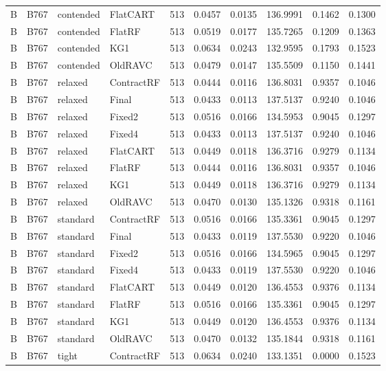 \begin{longtable}{@{}llllllllll@{}}
B & B767 & contended & FlatCART & 513 & 0.0457 & 0.0135 & 136.9991 & 0.1462 & 0.1300\\
B & B767 & contended & FlatRF & 513 & 0.0519 & 0.0177 & 135.7265 & 0.1209 & 0.1363\\
B & B767 & contended & KG1 & 513 & 0.0634 & 0.0243 & 132.9595 & 0.1793 & 0.1523\\
B & B767 & contended & OldRAVC & 513 & 0.0479 & 0.0147 & 135.5509 & 0.1150 & 0.1441\\
B & B767 & relaxed & ContractRF & 513 & 0.0444 & 0.0116 & 136.8031 & 0.9357 & 0.1046\\
B & B767 & relaxed & Final & 513 & 0.0433 & 0.0113 & 137.5137 & 0.9240 & 0.1046\\
B & B767 & relaxed & Fixed2 & 513 & 0.0516 & 0.0166 & 134.5953 & 0.9045 & 0.1297\\
B & B767 & relaxed & Fixed4 & 513 & 0.0433 & 0.0113 & 137.5137 & 0.9240 & 0.1046\\
B & B767 & relaxed & FlatCART & 513 & 0.0449 & 0.0118 & 136.3716 & 0.9279 & 0.1134\\
B & B767 & relaxed & FlatRF & 513 & 0.0444 & 0.0116 & 136.8031 & 0.9357 & 0.1046\\
B & B767 & relaxed & KG1 & 513 & 0.0449 & 0.0118 & 136.3716 & 0.9279 & 0.1134\\
B & B767 & relaxed & OldRAVC & 513 & 0.0470 & 0.0130 & 135.1326 & 0.9318 & 0.1161\\
B & B767 & standard & ContractRF & 513 & 0.0516 & 0.0166 & 135.3361 & 0.9045 & 0.1297\\
B & B767 & standard & Final & 513 & 0.0433 & 0.0119 & 137.5530 & 0.9220 & 0.1046\\
B & B767 & standard & Fixed2 & 513 & 0.0516 & 0.0166 & 134.5965 & 0.9045 & 0.1297\\
B & B767 & standard & Fixed4 & 513 & 0.0433 & 0.0119 & 137.5530 & 0.9220 & 0.1046\\
B & B767 & standard & FlatCART & 513 & 0.0449 & 0.0120 & 136.4553 & 0.9376 & 0.1134\\
B & B767 & standard & FlatRF & 513 & 0.0516 & 0.0166 & 135.3361 & 0.9045 & 0.1297\\
B & B767 & standard & KG1 & 513 & 0.0449 & 0.0120 & 136.4553 & 0.9376 & 0.1134\\
B & B767 & standard & OldRAVC & 513 & 0.0470 & 0.0132 & 135.1844 & 0.9318 & 0.1161\\
B & B767 & tight & ContractRF & 513 & 0.0634 & 0.0240 & 133.1351 & 0.0000 & 0.1523\\

\end{longtable}
